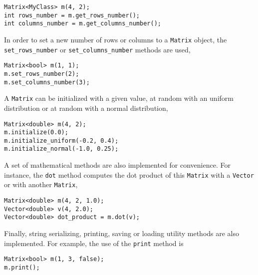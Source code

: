 \begin{lstlisting}
Matrix<MyClass> m(4, 2);
int rows_number = m.get_rows_number();
int columns_number = m.get_columns_number();
\end{lstlisting}

In order to set a new number of rows or columns to a \lstinline"Matrix" object, the \lstinline"set_rows_number" or \lstinline"set_columns_number" methods are used,

\begin{lstlisting}
Matrix<bool> m(1, 1);
m.set_rows_number(2);
m.set_columns_number(3);
\end{lstlisting}


A \lstinline"Matrix" can be initialized with a given value, at random with an uniform distribution or at random with a normal distribution, 

\begin{lstlisting}
Matrix<double> m(4, 2);
m.initialize(0.0);
m.initialize_uniform(-0.2, 0.4);
m.initialize_normal(-1.0, 0.25);
\end{lstlisting}


A set of mathematical methods are also implemented for convenience. For instance, the \lstinline"dot" method computes the dot product of this \lstinline"Matrix" with a \lstinline"Vector" or with another \lstinline"Matrix",

\begin{lstlisting}
Matrix<double> m(4, 2, 1.0);
Vector<double> v(4, 2.0);
Vector<double> dot_product = m.dot(v);
\end{lstlisting}


Finally, string serializing, printing, saving or loading utility methods are also implemented. For example, the use of the \lstinline"print" method is

\begin{lstlisting}
Matrix<bool> m(1, 3, false);
m.print();
\end{lstlisting}
